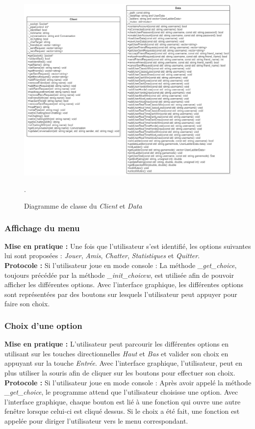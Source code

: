 \documentclass[10pt, a4paper]{article}
\begin{document}
\begin{figure}[H]
\centering
\includegraphics[scale=0.72]{client_data.png}
\caption{Diagramme de classe du \textit{Client} et \textit{Data}}.
\end{figure}



\subsubsection{Affichage du menu}
\textbf{Mise en pratique :} Une fois que l'utilisateur s'est identifié, les options suivantes lui sont proposées : \textit{Jouer}, \textit{Amis}, \textit{Chatter}, \textit{Statistiques} et \textit{Quitter}.\\
\textbf{Protocole :} Si l'utilisateur joue en mode console : La méthode \textit{\_get\_choice}, toujours précédée par la méthode \textit{\_init\_choicew}, est utilisée afin de pouvoir afficher les différentes options. Avec l'interface graphique, les différentes options sont représentées par des boutons sur lesquels l'utilisateur peut appuyer pour faire son choix.\\

\subsubsection{Choix d'une option}
\textbf{Mise en pratique :} L'utilisateur peut parcourir les différentes options en utilisant sur les touches directionnelles \textit{Haut} et \textit{Bas} et valider son choix en appuyant sur la touche \textit{Entrée}. Avec l'interface graphique,
l'utilisateur, peut en plus utiliser la souris afin de cliquer sur les boutons pour effectuer son choix.\\
\textbf{Protocole :} Si l'utilisateur joue en mode console :  Après avoir appelé la méthode \textit{\_get\_choice}, le programme attend que l'utilisateur choisisse une option. Avec l'interface graphique, chaque bouton est lié à une fonction qui ouvre une autre fenêtre lorsque celui-ci est cliqué dessus. Si le choix a été fait, une fonction est appelée pour diriger l'utilisateur vers le menu correspondant.\\
\end{document}
